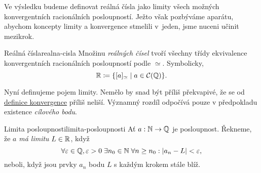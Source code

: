 Ve výsledku budeme definovat reálná čísla jako limity všech možných
konvergentních racionálních posloupností. Ježto však pozbýváme aparátu, abychom
koncepty limity a konvergence stmelili v~jeden, jsme nuceni učinit mezikrok.

\begin{definition}{Reálná čísla}{realna-cisla}
 Množinu \emph{reálných čísel} tvoří všechny třídy ekvivalence konvergentních
 racionálních posloupností podle $ \simeq $. Symbolicky,
 \[
  \mathbb{R} \coloneqq \{[a]_{ \simeq } \mid a \in \mathcal{C}(\mathbb{Q})\}.
 \]
\end{definition}

Nyní definujeme pojem limity. Nemělo by snad být příliš překvapivé, že se od
\hyperref[def:konvergentni-posloupnost]{definice konvergence} příliš neliší.
Významný rozdíl odpočívá pouze v předpokladu existence \emph{cílového bodu}.

\begin{definition}{Limita posloupnosti}{limita-posloupnosti}
 Ať $a:\mathbb{N} \to \mathbb{Q}$ je posloupnost. Řekneme, že $a$ \emph{má limitu} $L \in \mathbb{R}$,
 když
 \[
  \forall \varepsilon \in \mathbb{Q},\varepsilon>0 \; \exists n_0 \in \mathbb{N} \; \forall n
  \geq n_0: |a_n - L|<\varepsilon,
 \]
 neboli, když jsou prvky $a_n$ bodu $L$ s každým krokem stále blíž.
\end{definition}
